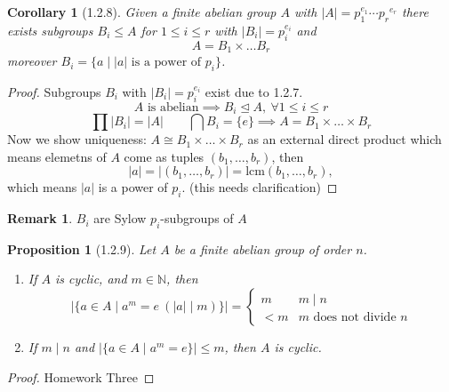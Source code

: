 \documentclass[11pt,leqno,oneside]{amsart}
\newcommand{\N}{{\mathbb N}} %
\newcommand{\normsubgroup}{\mathrel{\unlhd}}
\newcommand{\isom}{\mathrel{\cong}}
\newcommand{\primedecomposition}[3]{#1_1^{#2_1} \cdots {#1_{#3}}^{#2_{#3}}}
\newtheorem*{prop*}{Proposition}
\newtheorem*{cor*}{Corollary}
\theoremstyle{definition}
\newtheorem*{rmk*}{Remark}
\numberwithin{equation}{section}
\begin{document}
\begin{cor*}[1.2.8]
  Given a finite abelian group \(A\) with \(|A|=\primedecomposition{p}{e}{r}\) there exists subgroups \(B_i \le A\) for
  \(1 \le i \le r\) with \(|B_i|=p_i^{e_i}\) and
  \[A = B_1 \times \ldots B_r\]
  moreover \(B_i = \{a \mid |a| \text{ is a power of } p_i\}\).
\end{cor*}

\begin{proof}
  Subgroups \(B_i\) with \(|B_i|=p_i^{e_i}\) exist due to 1.2.7. 
  \[A \text{ is abelian} \implies B_i \normsubgroup A,\ \forall 1 \le i \le r\]
  \[\prod|B_i| = |A| \qquad \bigcap B_i = \{e\} \implies A = B_1 \times \ldots \times B_r\]
  Now we show uniqueness: \(A \isom B_1 \times \ldots \times B_r\) as an external direct product which means elemetns of
  \(A\) come as tuples \((b_1,\ldots,b_r)\), then 
  \[|a|=|(b_1,\ldots,b_r)|=\text{lcm}(b_1,\ldots,b_r),\]
  which means \(|a|\) is a power of \(p_i\). (this needs clarification)
\end{proof}

\begin{rmk*}
  \(B_i\) are Sylow \(p_i\)-subgroups of \(A\)
\end{rmk*}

\begin{prop*}[1.2.9]
  Let \(A\) be a finite abelian group of order \(n\).
  \begin{enumerate}
  \item[(a)] If \(A\) is cyclic, and \(m \in \N\), then
    \[|\{a \in A \mid a^m = e\ (|a| \mid m)\}| =
      \begin{cases}
        m   &  m \mid n\\
        <m  &  m \text{ does not divide } n
      \end{cases}
\]
 \item[(b)] If \(m \mid n\) and \(|\{a \in A \mid a^m = e\}| \le m\), then \(A\) is cyclic.
  \end{enumerate}
\end{prop*}
\begin{proof}
  Homework Three
\end{proof}
\end{document}
